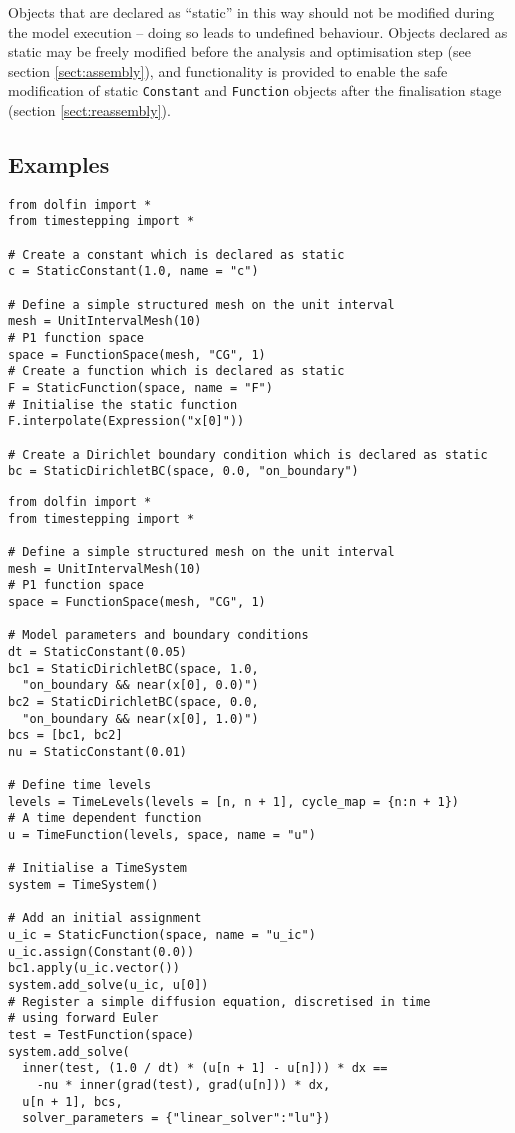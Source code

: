 \documentclass[a4paper]{book}
\begin{document}
Objects that are declared as ``static'' in this way should not be modified
during the model execution -- doing so leads to undefined behaviour. Objects
declared as static may be freely modified before the analysis and optimisation
step (see section \ref{sect:assembly}), and functionality is provided to enable
the safe modification of static \verb+Constant+ and \verb+Function+ objects
after the finalisation stage (section \ref{sect:reassembly}).

\subsection*{Examples}

\begin{lstlisting}
from dolfin import *
from timestepping import *

# Create a constant which is declared as static
c = StaticConstant(1.0, name = "c")

# Define a simple structured mesh on the unit interval
mesh = UnitIntervalMesh(10)
# P1 function space
space = FunctionSpace(mesh, "CG", 1)
# Create a function which is declared as static
F = StaticFunction(space, name = "F")
# Initialise the static function
F.interpolate(Expression("x[0]"))

# Create a Dirichlet boundary condition which is declared as static
bc = StaticDirichletBC(space, 0.0, "on_boundary")
\end{lstlisting}

\begin{lstlisting}
from dolfin import *
from timestepping import *

# Define a simple structured mesh on the unit interval
mesh = UnitIntervalMesh(10)
# P1 function space
space = FunctionSpace(mesh, "CG", 1)

# Model parameters and boundary conditions
dt = StaticConstant(0.05)
bc1 = StaticDirichletBC(space, 1.0,
  "on_boundary && near(x[0], 0.0)")
bc2 = StaticDirichletBC(space, 0.0,
  "on_boundary && near(x[0], 1.0)")
bcs = [bc1, bc2]
nu = StaticConstant(0.01)

# Define time levels
levels = TimeLevels(levels = [n, n + 1], cycle_map = {n:n + 1})
# A time dependent function
u = TimeFunction(levels, space, name = "u")

# Initialise a TimeSystem
system = TimeSystem()

# Add an initial assignment
u_ic = StaticFunction(space, name = "u_ic")
u_ic.assign(Constant(0.0))
bc1.apply(u_ic.vector())
system.add_solve(u_ic, u[0])
# Register a simple diffusion equation, discretised in time
# using forward Euler
test = TestFunction(space)
system.add_solve(
  inner(test, (1.0 / dt) * (u[n + 1] - u[n])) * dx ==
    -nu * inner(grad(test), grad(u[n])) * dx,
  u[n + 1], bcs,
  solver_parameters = {"linear_solver":"lu"})
\end{lstlisting}
\end{document}
